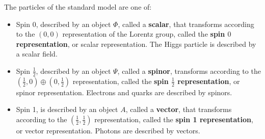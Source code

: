 \documentclass[11pt]{article}
\numberwithin{equation}{section}
\begin{document}
The particles of the standard model are one of:
\begin{itemize}
\item Spin 0, described by an object $\Phi$, called a \textbf{scalar}, that transforms according to the $(0,0)$ representation of the Lorentz group, called the \textbf{spin $0$ representation}, or scalar representation. The Higgs particle is described by a scalar field.
\item Spin $\frac{1}{2}$, described by an object $\Psi$, called a \textbf{spinor}, transforms according to the $(\frac{1}{2}, 0) \oplus (0, \frac{1}{2})$ representation, called the \textbf{spin $\frac{1}{2}$ representation}, or spinor representation. Electrons and quarks are described by spinors.
\item Spin 1, is described by an object $A$, called a \textbf{vector}, that transforms according to the $(\frac{1}{2}, \frac{1}{2})$ representation, called the \textbf{spin 1 representation}, or vector representation. Photons are described by vectors.
\end{itemize}

\newpage
 
\end{document}
